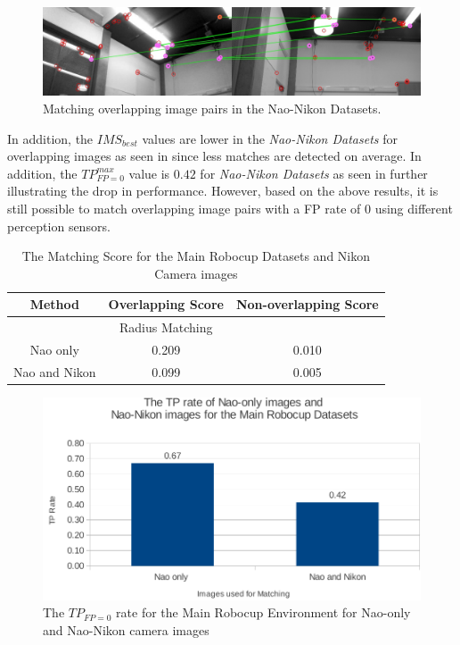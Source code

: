 \begin{figure}[h!] 
  \centering
    \includegraphics[width=1.0\textwidth]{../Drawings/Matching/NaoNikonRobocupDataset.jpg}
    \caption{Matching overlapping image pairs in the Nao-Nikon Datasets.}
    \label{fig:mrd_nikon_match}
\end{figure}


In addition, the $IMS_{best}$ values are lower in the \textit{Nao-Nikon Datasets} for overlapping images as seen in  since less matches are detected on average. In addition, the $TP_{FP=0}^{max}$ value is $0.42$ for \textit{Nao-Nikon Datasets} as seen in  further illustrating the drop in performance. However, based on the above results, it is still possible to match overlapping image pairs with a FP rate of $0$ using different perception sensors.\\

\begin{table}
\centering
\caption{The Matching Score for the Main Robocup Datasets and Nikon Camera
images}
\begin{tabular}{|c|c|c|}
\hline 
Method & Overlapping Score & Non-overlapping Score\tabularnewline
\hline 
\hline 
 & Radius Matching & \tabularnewline
\hline 
Nao only & 0.209 & 0.010\tabularnewline
\hline 
Nao and Nikon & 0.099 & 0.005\tabularnewline
\hline 
\end{tabular}
\label{tab:ms_nikon_mrd}
\end{table}


\begin{figure}[h!] 
  \centering
    \includegraphics[width=1.0\textwidth]{../Drawings/Graphs/tp_rate_nikon_mrd.pdf}
    \caption{The $TP_{FP=0}$ rate for the Main Robocup Environment for Nao-only and Nao-Nikon camera images}
    \label{fig:tp_rate_nikon_mrd}
\end{figure}


